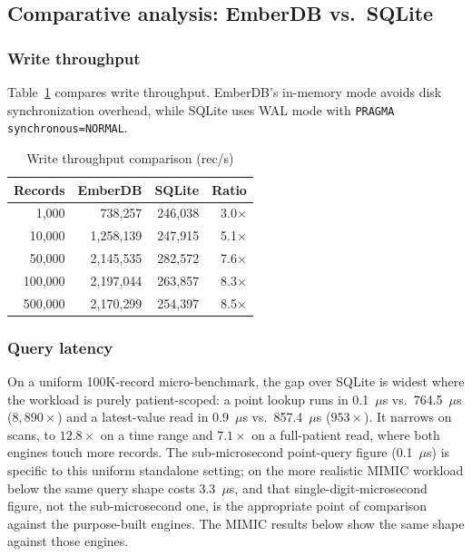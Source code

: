 \documentclass[journal]{IEEEtran}
\begin{document}
\subsection{Comparative analysis: EmberDB vs.\ SQLite}

\subsubsection{Write throughput}
Table~\ref{tab:comp_write} compares write throughput.
EmberDB's in-memory mode avoids disk synchronization overhead, while SQLite uses WAL mode with \texttt{PRAGMA synchronous=NORMAL}.

\begin{table}[htbp]
\centering
\caption{Write throughput comparison (rec/s)}
\label{tab:comp_write}
\begin{tabular}{rrrr}
\toprule
\textbf{Records} & \textbf{EmberDB} & \textbf{SQLite} & \textbf{Ratio} \\
\midrule
1{,}000 & 738{,}257 & 246{,}038 & 3.0$\times$ \\
10{,}000 & 1{,}258{,}139 & 247{,}915 & 5.1$\times$ \\
50{,}000 & 2{,}145{,}535 & 282{,}572 & 7.6$\times$ \\
100{,}000 & 2{,}197{,}044 & 263{,}857 & 8.3$\times$ \\
500{,}000 & 2{,}170{,}299 & 254{,}397 & 8.5$\times$ \\
\bottomrule
\end{tabular}
\end{table}

\subsubsection{Query latency}
On a uniform 100K-record micro-benchmark, the gap over SQLite is widest where the workload is purely patient-scoped: a point lookup runs in 0.1~$\mu$s vs.\ 764.5~$\mu$s ($8{,}890\times$) and a latest-value read in 0.9~$\mu$s vs.\ 857.4~$\mu$s ($953\times$). It narrows on scans, to $12.8\times$ on a time range and $7.1\times$ on a full-patient read, where both engines touch more records. The sub-microsecond point-query figure (0.1~$\mu$s) is specific to this uniform standalone setting; on the more realistic MIMIC workload below the same query shape costs 3.3~$\mu$s, and that single-digit-microsecond figure, not the sub-microsecond one, is the appropriate point of comparison against the purpose-built engines. The MIMIC results below show the same shape against those engines.
\end{document}
